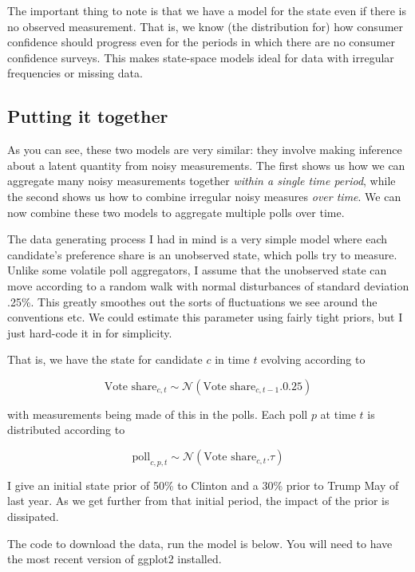 \documentclass[]{book}
\begin{document}
The important thing to note is that we have a model for the state even
if there is no observed measurement. That is, we know (the distribution
for) how consumer confidence should progress even for the periods in
which there are no consumer confidence surveys. This makes state-space
models ideal for data with irregular frequencies or missing data.

\subsection{Putting it together}\label{putting-it-together}

As you can see, these two models are very similar: they involve making
inference about a latent quantity from noisy measurements. The first
shows us how we can aggregate many noisy measurements together
\emph{within a single time period}, while the second shows us how to
combine irregular noisy measures \emph{over time}. We can now combine
these two models to aggregate multiple polls over time.

The data generating process I had in mind is a very simple model where
each candidate's preference share is an unobserved state, which polls
try to measure. Unlike some volatile poll aggregators, I assume that the
unobserved state can move according to a random walk with normal
disturbances of standard deviation .25\%. This greatly smoothes out the
sorts of fluctuations we see around the conventions etc. We could
estimate this parameter using fairly tight priors, but I just hard-code
it in for simplicity.

That is, we have the state for candidate \(c\) in time \(t\) evolving
according to

\[
\mbox{Vote share}_{c, t} \sim \mathcal{N} (\mbox{Vote share}_{c, t-1}. 0.25)
\]

with measurements being made of this in the polls. Each poll \(p\) at
time \(t\) is distributed according to

\[
\mbox{poll}_{c, p, t} \sim \mathcal{N} (\mbox{Vote share}_{c, t}. \tau)
\]

I give an initial state prior of 50\% to Clinton and a 30\% prior to
Trump May of last year. As we get further from that initial period, the
impact of the prior is dissipated.

The code to download the data, run the model is below. You will need to
have the most recent version of ggplot2 installed.
\end{document}
